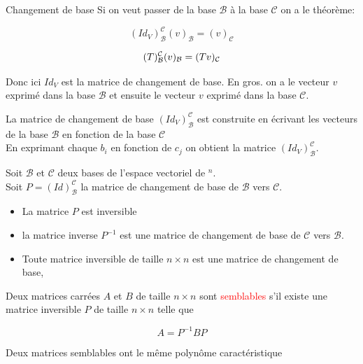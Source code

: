 \begin{parag}{Changement de base}
    Si on veut passer de la base $\mathcal{B}$ à la base $\mathcal{C}$ on a le théorème:
    \begin{truc}
        \[(Id_V)_{\mathcal{B}}^\mathcal{C}(v)_{\mathcal{B}} = (v)_{\mathcal{C}}\]
    \end{truc}
    \begin{theoreme}
        \[(T)_{\mathcal{B}}^{\mathcal{C}} (v)_{\mathcal{B}} = (Tv)_{\mathcal{C}}\]
    \end{theoreme}
    Donc ici $Id_V$ est la matrice de changement de base. En gros. on a le vecteur $v$ exprimé dans la base $\mathcal{B}$ et ensuite le vecteur $v$ exprimé dans la base $\mathcal{C}$.
    \begin{truc}
        La matrice de changement de base $(Id_V)_{\mathcal{B}}^\mathcal{C}$ est construite en écrivant les vecteurs de la base $\mathcal{B}$ en fonction de la base $\mathcal{C}$\\
        En exprimant chaque $b_i$ en fonction de $c_j$ on obtient la matrice $(Id_V)_{\mathcal{B}}^\mathcal{C}$.
    \end{truc}
    \begin{truc}
        Soit $\mathcal{B}$ et $\mathcal{C}$ deux bases de l'espace vectoriel de \R$^n$.\\
        Soit $P = (Id)_{\mathcal{B}}^{\mathcal{C}}$ la matrice de changement de base de $\mathcal{B}$ vers $\mathcal{C}$.
        \begin{itemize}
            \item La matrice $P$ est inversible
            \item la matrice inverse $P^{-1}$ est une matrice de changement de base de $\mathcal{C}$ vers $\mathcal{B}$.
            \item Toute matrice inversible de taille $n \times n$ est une matrice de changement de base,
        \end{itemize}
    \end{truc}
    \begin{definition}
        Deux matrices carrées $A$ et $B$ de taille $n \times n$ sont \textcolor{red}{semblables} s'il existe une matrice inversible $P$ de taille $n \times n$ telle que 
        \begin{formule}
            \[A = P^{-1}BP\]
        \end{formule}
    \end{definition}
    \begin{truc}
        Deux matrices semblables ont le même polynôme caractéristique

\end{truc}
\end{parag}
